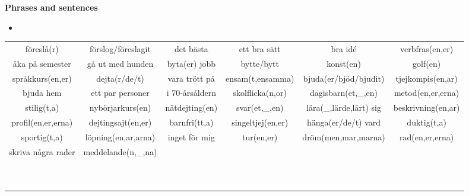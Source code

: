
\begin{flushleft}
    \textbf{Phrases and sentences}
    \begin{itemize}
        \item 
    \end{itemize}
\end{flushleft}

\begin{center}
    \begin{adjustwidth}{-2.5cm}{}
        \begin{tabular}{|c c c c c c|}
            \hline
            föreslå(r) & förslog/föreslagit & det bästa & ett bra sätt & bra id\'e & verbfras(en,er) \\
            åka på semester & gå ut med hunden & byta(er) jobb & bytte/bytt & konst(en) & golf(en) \\
            språkkurs(en,er) & dejta(r/de/t) & vara trött på & ensam(t,ensamma) & bjuda(er/bjöd/bjudit) & tjejkompis(en,ar) \\
            bjuda hem & ett par personer & i 70-årsåldern & skolflicka(n,or) & dagisbarn(et,\_,en) & metod(en,er,erna) \\
            stilig(t,a) & nybörjarkurs(en) & nätdejting(en) & svar(et,\_,en) & lära(\_,lärde,lärt) sig & beskrivning(en,ar) \\
            profil(en,er,erna) & dejtingsajt(en,er) & barnfri(tt,a) & singeltjej(en,er) & hänga(er/de/t) vard & duktig(t,a) \\
            sportig(t,a) & löpning(en,ar,arna) & inget för mig & tur(en,er) & dröm(men,mar,marna) & rad(en,er,erna) \\
            skriva några rader & meddelande(n,\_,na) &  &  &  &  \\
             &  &  &  &  &  \\
             &  &  &  &  &  \\
             &  &  &  &  &  \\
             &  &  &  &  &  \\
             &  &  &  &  &  \\
             &  &  &  &  &  \\
             &  &  &  &  &  \\
             &  &  &  &  &  \\
             &  &  &  &  &  \\
             &  &  &  &  &  \\

\end{tabular}
\end{adjustwidth}
\end{center}
